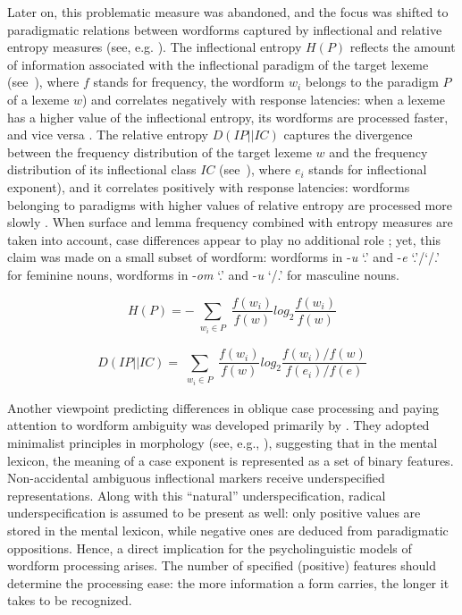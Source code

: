 \documentclass[output=paper, modfonts,newtxmath,hidelinks]{langscibook}
\begin{document}
Later on, this problematic measure was abandoned, and the focus was shifted to paradigmatic relations between wordforms captured by inflectional and relative entropy measures (see, e.g. \citealt{milin2009simultaneous}). The inflectional entropy $H(P)$ reflects the amount of information associated with the inflectional paradigm of the target lexeme (see~), where $f$ stands for frequency, the wordform $w_i$ belongs to the paradigm $P$ of a lexeme $w$) and correlates negatively with response latencies: when a lexeme has a higher value of the inflectional entropy, its wordforms are processed faster, and vice versa  \citep{del2004putting}. The relative entropy $D(IP||IC)$ captures the divergence between the frequency distribution of the target lexeme $w$ and the frequency distribution of its inflectional class $IC$ (see~), where $e_i$ stands for inflectional exponent), and it correlates positively with response latencies: wordforms belonging to paradigms with higher values of relative entropy are processed more slowly \citep{milin2009simultaneous}. When surface and lemma frequency combined with entropy measures are taken into account, case differences appear to play no additional role \citep{milin2009simultaneous}; yet, this claim was made on a small subset of wordform: wordforms in -\textit{u} `{\accc.\sg}’ and -\textit{e} ‘{\genn.\sg}’\slash ‘{\nomm/\accc.\pl}’ for feminine nouns, wordforms in -\textit{om} `{\ins.\sg}’ and -\textit{u} `{\datt/\locc.\sg}’ for masculine nouns.

	\ea\label{equation:inflEntropy}\begin{equation*}
		H(P) = -\sum_{\substack {w_i \in P}} \frac{f(w_i)}{f(w)} log _2\frac{f(w_i)}{f(w)}
        \end{equation*}
	\z

\ea\label{equation:relEntr}\begin{equation*}
		D(IP||IC) = \sum_{\substack {w_i \in P}} \frac{f(w_i)}{f(w)} log _2 \frac{f(w_i)/f(w)}{f(e_i)/f(e)}
        \end{equation*}
	\z

\noindent Another viewpoint predicting differences in oblique case processing and paying attention to wordform ambiguity was developed primarily by \citet{clahsen2001mental}. They adopted minimalist principles in morphology (see, e.g., \citealt{wunderlich1996minimalist}), suggesting that in the mental lexicon, the meaning of a case exponent is represented as a set of binary features. Non-accidental ambiguous inflectional markers receive underspecified representations. Along with this ``natural'' underspecification, radical underspecification is assumed to be present as well: only positive values are stored in the mental lexicon, while negative ones are deduced from paradigmatic oppositions. Hence, a direct implication for the psycholinguistic models of wordform processing arises. The number of specified (positive) features should determine the processing ease: the more information a form carries, the longer it takes to be recognized.
\end{document}
